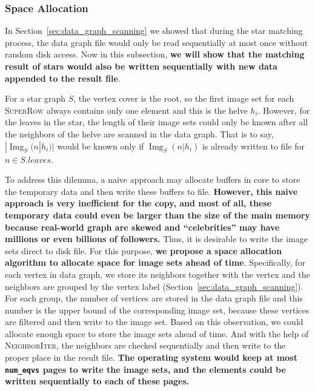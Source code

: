 \subsubsection{Space Allocation}\label{sec:space_allocation}
In Section~\ref{sec:data_graph_scanning} we showed that during the star matching process,
the data graph file would only be read sequentially at most once without random disk access.
Now in this subsection, \textbf{we will show that the matching result of stars would also be written sequentially with new data appended to the result file}.

For a star graph $S$, the vertex cover is the root, so the first image set for each \textsc{SuperRow} always contains only one element and this is the helve $h_i$.
However, for the leaves in the star, the length of their image sets could only be known after all the neighbors of the helve are scanned in the data graph.
That is to say, $|\operatorname{Img}_S(n|h_i)|$ would be known only if $\operatorname{Img}_S(n|h_i)$ is already written to file for $n \in S.leaves$.

To address this dilemma, a naive approach may allocate buffers in core to store the temporary data and then write these buffers to file.
\textbf{However, this naive approach is very inefficient for the copy, and most of all,
these temporary data could even be larger than the size of the main memory
because real-world graph are skewed and ``celebrities'' may have millions or even billions of followers.}
Thus, it is desirable to write the image sets direct to disk file.
For this purpose, \textbf{we propose a space allocation algorithm to allocate space for image sets ahead of time}.
Specifically, for each vertex in data graph, we store its neighbors together with the vertex and the neighbors are grouped by the vertex label (Section~\ref{sec:data_graph_scanning}).
For each group, the number of vertices are stored in the data graph file and this number is the upper bound of the corresponding image set, because these vertices are filtered and then write to the image set.
Based on this observation, we could allocate enough space to store the image sets ahead of time.
And with the help of \textsc{NeighborIter}, the neighbors are checked sequentially and then write to the proper place in the result file.
\textbf{The operating system would keep at most \texttt{num_eqvs} pages to write the image sets,
and the elements could be written sequentially to each of these pages.}
